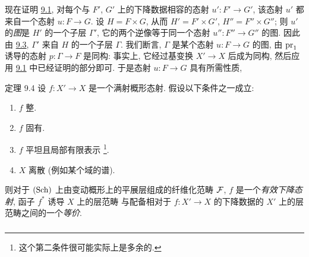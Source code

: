 现在证明 \hyperref[VIII.prop9.1]{9.1},
\ie 对每个与 $F'$, $G'$ 上的下降数据相容的态射 $u':F'\rightarrow G'$,
该态射 $u'$ 都来自一个态射 $u:F\rightarrow G$.
设 $H=F\times G$, 从而 $H'=F'\times G'$, $H''=F''\times G''$;
则 $u'$ 的\emph{图}是 $H'$ 的一个子层 $\Gamma'$,
它的两个逆像等于同一个态射 $u'':F''\rightarrow G''$ 的图.
因此由 \hyperref[VIII.lem9.3]{9.3},
$\Gamma'$ 来自 $H$ 的一个子层 $\Gamma$.
我们断言, $\Gamma$ 是某个态射 $u:F\rightarrow G$ 的图,
\ie 由 $\operatorname{pr}_{1}$ 诱导的态射 $p:\Gamma\rightarrow F$ 是同构:
事实上, 它经过基变换 $X'\rightarrow X$ 后成为同构,
然后应用 \hyperref[VIII.prop9.1]{9.1} 中已经证明的部分即可.
于是态射 $u:F\rightarrow G$ 具有所需性质, \cqfd

\begin{enonce*}{定理 9.4}
设 $f:X'\rightarrow X$ 是一个满射概形态射.
假设以下条件之一成立:
\begin{enumerate}
\renewcommand{\theenumi}{\alph{enumi}}
\renewcommand{\labelenumi}{\theenumi)}
\item $f$ 整.

\item $f$ 固有.

\item $f$ 平坦且局部有限表示
\footnote[1]{这个第二条件很可能实际上是多余的.}.

\item $X$ 离散 (例如某个域的谱).
\end{enumerate}

则对于 $(\operatorname{Sch})$ 上由变动概形上的平展层组成的纤维化范畴 ${\mathcal F}$,
$f$ 是一个\emph{有效下降态射},
\ie 函子 $f^{\ast}$ 诱导 $X$ 上的层范畴\pageoriginale
与配备相对于 $f:X'\rightarrow X$ 的下降数据的 $X'$ 上的层范畴之间的一个\emph{等价}.
\end{enonce*}

\setcounter{subsection}{4}
\setcounter{subsubsection}{0}
\subsubsection{}

